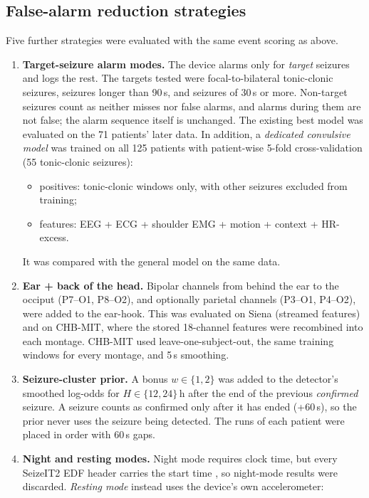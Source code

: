 \subsection{False-alarm reduction strategies}
\label{sec:m-fa}

Five further strategies were evaluated with the same event scoring as above.
\begin{enumerate}
\item \textbf{Target-seizure alarm modes.} The device alarms only for \emph{target} seizures and logs the rest. The targets tested were focal-to-bilateral tonic-clonic seizures, seizures longer than 90\,s, and seizures of 30\,s or more. Non-target seizures count as neither misses nor false alarms, and alarms during them are not false; the alarm sequence itself is unchanged. The existing best model was evaluated on the 71 patients' later data. In addition, a \emph{dedicated convulsive model} was trained on all 125 patients with patient-wise 5-fold cross-validation (55 tonic-clonic seizures):
\begin{itemize}
\item positives: tonic-clonic windows only, with other seizures excluded from training;
\item features: EEG + ECG + shoulder EMG + motion + context + HR-excess.
\end{itemize}
It was compared with the general model on the same data.
\item \textbf{Ear + back of the head.} Bipolar channels from behind the ear to the occiput (P7--O1, P8--O2), and optionally parietal channels (P3--O1, P4--O2), were added to the ear-hook. This was evaluated on Siena (streamed features) and on CHB-MIT, where the stored 18-channel features were recombined into each montage. CHB-MIT used leave-one-subject-out, the same training windows for every montage, and 5\,s smoothing.
\item \textbf{Seizure-cluster prior.} A bonus $w\in\{1,2\}$ was added to the detector's smoothed log-odds for $H\in\{12,24\}$\,h after the end of the previous \emph{confirmed} seizure. A seizure counts as confirmed only after it has ended (+60\,s), so the prior never uses the seizure being detected. The runs of each patient were placed in order with 60\,s gaps.
\item \textbf{Night and resting modes.} Night mode requires clock time, but every SeizeIT2 EDF header carries the start time , so night-mode results were discarded. \emph{Resting mode} instead uses the device's own accelerometer:

\end{enumerate}
